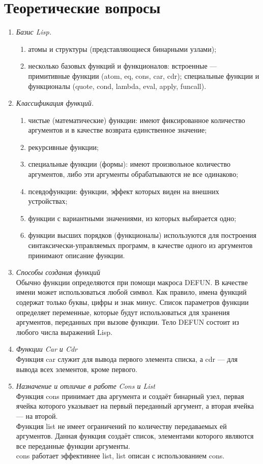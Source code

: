 \chapter{Теоретические вопросы}

\begin{enumerate}[wide=0pt]
\item \textit{Базис Lisp.} \\
\begin{enumerate}
	\item атомы и структуры (представляющиеся бинарными узлами);
	\item несколько базовых функций и функционалов: встроенные --- примитивные функции (atom, eq, cons, car, cdr); специальные функции и функционалы (quote, cond, lambda, eval, apply, funcall).
\end{enumerate}
\item \textit{Классификация функций.} \\
\begin{enumerate}
	\item чистые (математические) функции: имеют фиксированное количество
	аргументов и в качестве возврата единственное значение;
	\item рекурсивные функции;
	\item специальные функции (формы): имеют произвольное количество
	аргументов, либо эти аргументы обрабатываются не все одинаково;
	\item псевдофункции: функции, эффект которых виден на внешних
	устройствах;
	\item функции с вариантными значениями, из которых выбирается одно;
	\item функции высших порядков (функционалы) используются для
	построения синтаксически-управляемых программ, в качестве одного
	из аргументов принимают описание функции.
\end{enumerate}
\item \textit{Способы создания функций} \\
Обычно функции определяются при помощи макроса DEFUN. В качестве имени может использоваться любой символ. Как правило, имена функций содержат только буквы, цифры и знак минус. Список параметров функции определяет переменные, которые будут использоваться для хранения аргументов, переданных при вызове функции. Тело DEFUN состоит из любого числа выражений Lisp. 
\item \textit{Функции Car и Cdr} \\
Функция car служит для вывода первого элемента списка, а cdr --- для вывода всех элементов, кроме первого.
\item \textit{Назначение и отличие в работе Cons и List} \\
Функция cons принимает два аргумента и создаёт бинарный узел, первая ячейка которого указывает на первый переданный аргумент, а вторая ячейка --- на второй. \\
Функция list не имеет ограничений по количеству передаваемых ей аргументов. Данная функция создаёт список, элементами которого являются все переданные функции аргументы. \\
cons работает эффективнее list, list описан с использованием cons.
\end{enumerate}
